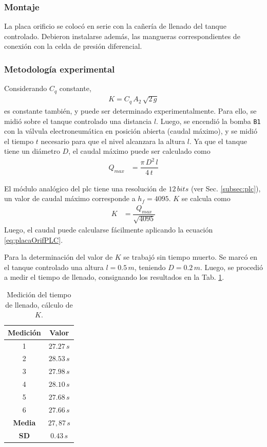 \subsubsection{Montaje}
La placa orificio se colocó en serie con la cañería de llenado del
tanque controlado.
Debieron instalarse además, las mangueras correspondientes de conexión
con la celda de presión diferencial.

\subsubsection{Metodología experimental}
Considerando $C_q$ constante,
\begin{align}
 K = C_q\, A_2\, \sqrt{2\,g}
\end{align}
es constante también, y puede ser determinado experimentalmente.
Para ello, se midió sobre el tanque controlado una distancia $l$.
Luego, se encendió la bomba \verb|B1| con la válvula electroneumática en
posición
abierta (caudal máximo), y se midió el tiempo $t$ necesario para que el nivel
alcanzara la altura $l$.
Ya que el tanque tiene un diámetro $D$, el caudal máximo puede ser
calculado como
\begin{align}
 Q_{max} &= \dfrac{\pi\,D^2\,l}{4\,t}
\end{align}

El módulo analógico del \gls{plc} tiene una resolución de $12\,bits$
(ver Sec. \ref{subsec:plc}), un valor de caudal máximo corresponde a $h_f =
4095$.
$K$ se calcula como
\begin{align}
 K &= \dfrac{Q_{max}}{\sqrt{4095}}
\end{align}
Luego, el caudal puede calcularse fácilmente aplicando la ecuación
\eqref{eq:placaOrifPLC}.

Para la determinación del valor de $K$ se trabajó sin tiempo muerto.
Se marcó en el tanque controlado una altura $l=0.5\,m$, teniendo $D=0.2\,m$.
Luego, se procedió a medir el tiempo de llenado, consignando los resultados en
la Tab. \ref{tab:tiempoK}.

\begin{table}[h]
\renewcommand{\arraystretch}{1.3}
  \centering
  \bgroup
  \begin{tabular}{|c|c|}
  \hline
  Medición & Valor\\
  \hline
  1 & $27.27\,s$ \\
  2 & $28.53\,s$ \\
  3 & $27.98\,s$ \\
  4 & $28.10\,s$ \\
  5 & $27.68\,s$ \\
  6 & $27.66\,s$ \\
  \hline
  \hline
  \textbf{Media} & $27,87\,s$\\
  \textbf{SD} & $0.43\,s$\\
  \hline
  \end{tabular}
  \egroup
  \caption{Medición del tiempo de llenado, cálculo de $K$.}
  \label{tab:tiempoK}
\end{table}

